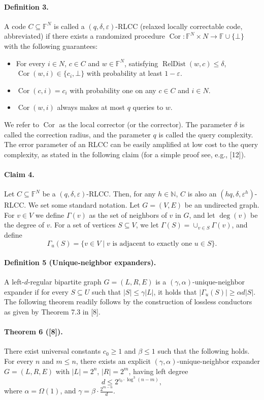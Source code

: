 \paragraph{Definition 3.} A code $C\subseteq\mathbb F^N$ is called a $(q,\delta,\varepsilon)$-RLCC (relaxed locally correctable code, abbreviated) if there exists a randomized procedure $\operatorname{Cor}:\mathbb F^N\times N\to\mathbb F\cup\{\bot\}$ with the following guarantees:
\begin{itemize}
\item For every $i\in N$, $c\in C$ and $w\in\mathbb F^N$, satisfying $\operatorname{RelDist}(w,c)\le\delta$, $\operatorname{Cor}(w,i)\in\{c_i,\bot\}$ with probability at least $1-\varepsilon$.
\item $\operatorname{Cor}(c,i)=c_i$ with probability one on any $c\in C$ and $i\in N$.
\item $\operatorname{Cor}(w,i)$ always makes at most $q$ queries to $w$.
\end{itemize}
We refer to $\operatorname{Cor}$ as the local corrector (or the corrector). The parameter $\delta$ is called the correction radius, and the parameter $q$ is called the query complexity.
The error parameter of an RLCC can be easily amplified at low cost to the query complexity, as stated in the following claim (for a simple proof see, e.g., [12]).
\paragraph{Claim 4.} Let $C\subseteq\mathbb F^N$ be a $(q,\delta,\varepsilon)$-RLCC. Then, for any $h\in\mathbb N$, $C$ is also an $(hq,\delta,\varepsilon^h)$-RLCC.
We set some standard notation. Let $G=(V,E)$ be an undirected graph. For $v\in V$ we define $\Gamma(v)$ as the set of neighbors of $v$ in $G$, and let $\deg(v)$ be the degree of $v$. For a set of vertices $S\subseteq V$, we let $\Gamma(S)=\cup_{v\in S}\Gamma(v)$, and define
\[\Gamma_u(S)=\{v\in V\mid v\text{ is adjacent to exactly one }u\in S\}.\]
\paragraph{Definition 5 (Unique-neighbor expanders).} A left-$d$-regular bipartite graph $G=(L,R,E)$ is a $(\gamma,\alpha)$-unique-neighbor expander if for every $S\subseteq U$ such that $|S|\le\gamma|L|$, it holds that $|\Gamma_u(S)|\ge\alpha d|S|$.
The following theorem readily follows by the construction of lossless conductors as given by Theorem 7.3 in [8].
\paragraph{Theorem 6 ([8]).} There exist universal constants $c_0\ge1$ and $\beta\le1$ such that the following holds. For every $n$ and $m\le n$, there exists an explicit $(\gamma,\alpha)$-unique-neighbor expander $G=(L,R,E)$ with $|L|=2^n$, $|R|=2^m$, having left degree
\[d\le2^{c_0\cdot\log^3(n-m)},\]
where $\alpha=\Omega(1)$, and $\gamma=\beta\cdot\frac{2^{m-n}}d$.
